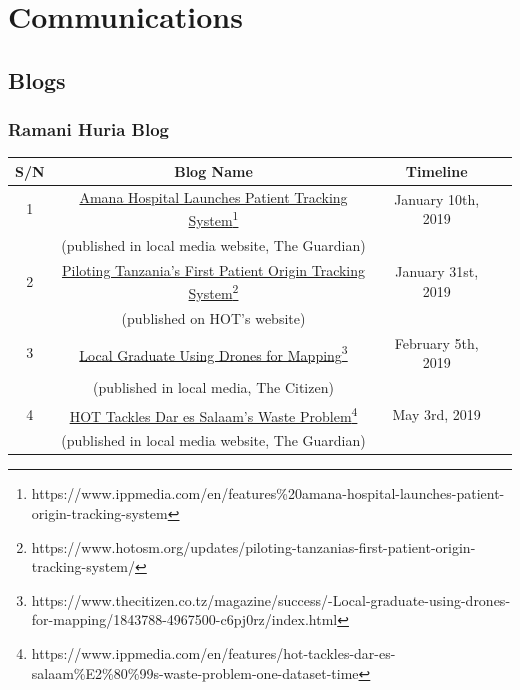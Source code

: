 \documentclass[a4paper,12pt,twoside]{article}
\begin{document}
\newpage
\section{Communications}
\subsection{Blogs}
\subsubsection{Ramani Huria Blog}
\begin{tabular}{|c|c|c|c|}
\hline
\bfseries S/N & \bfseries Blog Name & \bfseries Timeline\\
\hline
1 & \href{https://www.ippmedia.com/en/features\%20amana-hospital-launches-patient-origin-tracking-system}{Amana Hospital Launches Patient Tracking System\footnote{\url{https://www.ippmedia.com/en/features\%20amana-hospital-launches-patient-origin-tracking-system}}}  & January 10th, 2019\\
{} & (published in local media website, The Guardian) & {}\\
\hline
2 & \href{https://www.hotosm.org/updates/piloting-tanzanias-first-patient-origin-tracking-system/}{Piloting Tanzania’s First Patient Origin Tracking System\footnote{\url{https://www.hotosm.org/updates/piloting-tanzanias-first-patient-origin-tracking-system/}}} & January 31st, 2019\\
{} & (published on HOT’s website) & {}\\
\hline
3 & \href{https://www.thecitizen.co.tz/magazine/success/-Local-graduate-using-drones-for-mapping/1843788-4967500-c6pj0rz/index.html}{Local Graduate Using Drones for Mapping\footnote{\url{https://www.thecitizen.co.tz/magazine/success/-Local-graduate-using-drones-for-mapping/1843788-4967500-c6pj0rz/index.html}}} & February 5th, 2019\\
{} & (published in local media, The Citizen) & {}\\
\hline
4 & \href{https://www.ippmedia.com/en/features/hot-tackles-dar-es-salaam\%E2\%80\%99s-waste-problem-one-dataset-time}{HOT Tackles Dar es Salaam’s Waste Problem\footnote{\url{https://www.ippmedia.com/en/features/hot-tackles-dar-es-salaam\%E2\%80\%99s-waste-problem-one-dataset-time}}} & May 3rd, 2019\\
{} & (published in local media website, The Guardian) & {}\\
\hline
\end{tabular}
\end{document}
